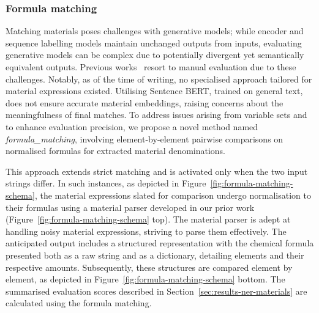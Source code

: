 \subsubsection{Formula matching}

Matching materials poses challenges with generative models; while encoder and sequence labelling models maintain unchanged outputs from inputs, evaluating generative models can be complex due to potentially divergent yet semantically equivalent outputs. 
Previous works~\cite{taylor2022galactica} resort to manual evaluation due to these challenges. Notably, as of the time of writing, no specialised approach tailored for material expressions existed. 
Utilising Sentence BERT, trained on general text, does not ensure accurate material embeddings, raising concerns about the meaningfulness of final matches. 
To address issues arising from variable sets and to enhance evaluation precision, we propose a novel method named \textit{formula\_matching}, involving element-by-element pairwise comparisons on normalised formulas for extracted material denominations.




This approach extends strict matching and is activated only when the two input strings differ. In such instances, as depicted in Figure~\ref{fig:formula-matching-schema}, the material expressions slated for comparison undergo normalisation to their formulas using a material parser developed in our prior work~\cite{lfoppiano2023automatic} (Figure~\ref{fig:formula-matching-schema} top). The material parser is adept at handling noisy material expressions, striving to parse them effectively. The anticipated output includes a structured representation with the chemical formula presented both as a raw string and as a dictionary, detailing elements and their respective amounts. 
Subsequently, these structures are compared element by element, as depicted in Figure~\ref{fig:formula-matching-schema} bottom.
The summarised evaluation scores described in Section~\ref{sec:results-ner-materials} are calculated using the formula matching. 

